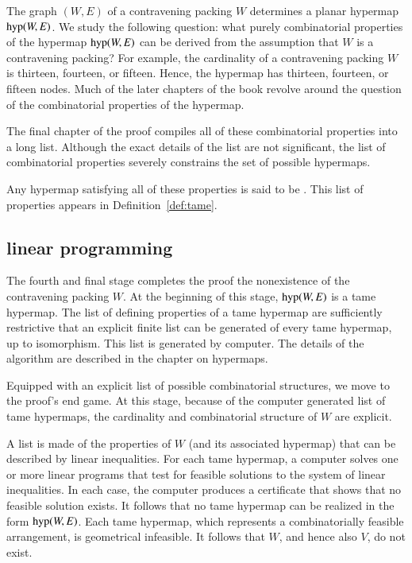 The graph $(W,E)$ of a contravening packing $W$ determines a planar hypermap
${\operatorname{hyp}}(W,E)$. We study the following question: what  purely
combinatorial properties of the hypermap ${\operatorname{hyp}}(W,E)$ can be derived from
the assumption  that
$W$ is a contravening packing?  For example, the cardinality of a
contravening packing $W$ is thirteen, fourteen, or fifteen.  Hence, the hypermap
has thirteen, fourteen, or fifteen nodes.  Much of the later chapters of the book
revolve around the question of the combinatorial properties of the
hypermap.

The final chapter of the proof compiles all of these combinatorial
properties into a long list.  
Although the exact details of the list are not significant,
the list of combinatorial properties severely constrains the set of possible
hypermaps.  

Any hypermap satisfying all of these properties is said to be
.  This list of properties appears in
Definition~\ref{def:tame}.


\subsection{linear programming}

The fourth and final stage completes the proof the nonexistence of
the contravening packing $W$.  At the beginning of this stage,
${\operatorname{hyp}}(W,E)$ is a tame hypermap.  The list of defining properties
of a tame hypermap are sufficiently restrictive that an explicit finite
list can be generated of every tame hypermap, up to isomorphism.  
This list is generated by computer.  The details of the algorithm are
described in the chapter on hypermaps.

Equipped with an explicit list of possible combinatorial structures,
we move to the proof's end game.  At this stage, because of the computer
generated list of tame hypermaps, the cardinality and
combinatorial structure of $W$ are explicit.

A list is made of the properties of $W$ (and its associated hypermap)
that can be described by linear inequalities.  For each tame hypermap,
a computer solves one or more linear programs that test for feasible
solutions to the system of linear inequalities.  In each case, the
computer produces a certificate that shows that no feasible solution
exists.  It follows that no tame hypermap can be realized in the form
${\operatorname{hyp}}(W,E)$.  Each tame hypermap, which represents a
combinatorially feasible arrangement, is geometrical infeasible.  It
follows that $W$, and hence also $V$, do not exist.

